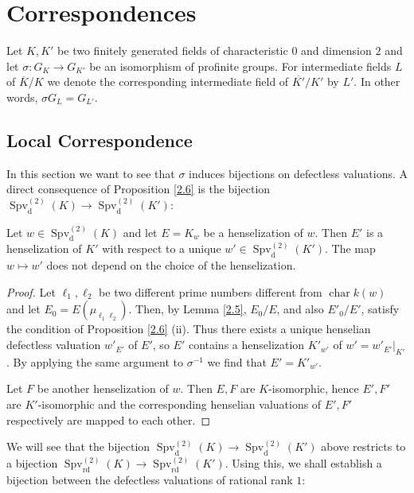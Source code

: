\chapter{Correspondences}

Let $K,K'$ be two finitely generated fields of characteristic $0$ and dimension $2$ and let $\sigma:G_K\to G_{K'}$ be an isomorphism of profinite groups. For intermediate fields $L$ of $\overline{K}/K$ we denote the corresponding intermediate field of $\overline{K'}/K'$ by $L'$. In other words, $\sigma G_L=G_{L'}$.

\section{Local Correspondence}

In this section we want to see that $\sigma$ induces bijections on defectless valuations. A direct consequence of Proposition \ref{2.6} is the bijection $\operatorname{Spv}_\text{d}^{(2)}(K)\to \operatorname{Spv}_\text{d}^{(2)}(K')$:

\begin{lemma}\label{3.1}
Let $w\in\operatorname{Spv}_\text{d}^{(2)}(K)$ and let $E=K_w$ be a henselization of $w$. Then $E'$ is a henselization of $K'$ with respect to a unique $w'\in\operatorname{Spv}_\text{d}^{(2)}(K')$. The map $w\mapsto w'$ does not depend on the choice of the henselization.
\end{lemma}

\begin{proof}
Let $\ell_1,\ell_2$ be two different prime numbers different from $\operatorname{char} k(w)$ and let $E_0 = E(\mu_{\ell_1\ell_2})$. Then, by Lemma \ref{2.5}, $E_0/E$, and also $E'_0/E'$, satisfy the condition of Proposition \ref{2.6} (ii). Thus there exists a unique henselian defectless valuation $w'_{E'}$ of $E'$, so $E'$ contains a henselization $K'_{w'}$ of $w' = w'_{E'}|_{K'}$. By applying the same argument to $\sigma^{-1}$ we find that $E' = K'_{w'}$.

Let $F$ be another henselization of $w$. Then $E, F$ are $K$-isomorphic, hence $E',F'$ are $K'$-isomorphic and the corresponding henselian valuations of $E', F'$ respectively are mapped to each other.
\end{proof}

We will see that the bijection $\operatorname{Spv}_\text{d}^{(2)}(K)\to \operatorname{Spv}_\text{d}^{(2)}(K')$ above restricts to a bijection $\operatorname{Spv}_\text{rd}^{(2)}(K)\to \operatorname{Spv}_\text{rd}^{(2)}(K')$. Using this, we shall establish a bijection between the defectless valuations of rational rank $1$:

